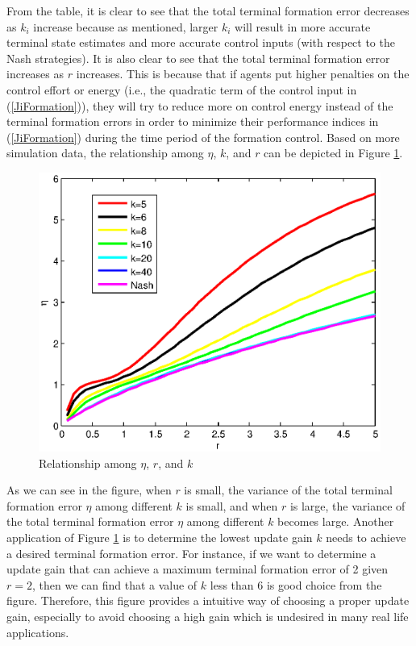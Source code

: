 \documentclass[12pt,draftcls,onecolumn]{IEEEtran}  %
\begin{document}
From the table, it is clear to see that the total terminal formation error decreases as $k_i$ increase because as mentioned, larger $k_i$ will result in more accurate terminal state estimates and more accurate control inputs (with respect to the Nash strategies). It is also clear to see that the total terminal formation error increases as $r$ increases. This is because that if agents put higher penalties on the control effort or energy (i.e., the quadratic term of the control input in (\ref{JiFormation})), they will try to reduce more on control energy instead of the terminal formation errors in order to minimize their performance indices in (\ref{JiFormation}) during the time period of the formation control. Based on more simulation data, the relationship among $\eta$, $k$, and $r$ can be depicted in Figure \ref{Relationship}.
\begin{figure}[h]
      \centering
      \includegraphics[scale=0.5]{PlotT.eps}
      \caption{Relationship among $\eta$, $r$, and $k$}\label{Relationship}
\end{figure}
As we can see in the figure, when $r$ is small, the variance of the total terminal formation error $\eta$ among different $k$ is small, and when $r$ is large, the variance of the total terminal formation error $\eta$ among different $k$ becomes large. Another application of Figure \ref{Relationship} is to determine the lowest update gain $k$ needs to achieve a desired terminal formation error. For instance, if we want to determine a update gain that can achieve a maximum terminal formation error of 2 given $r=2$, then we can find that a value of $k$ less than $6$ is good choice from the figure. Therefore, this figure provides a intuitive way of choosing a proper update gain, especially to avoid choosing a high gain which is undesired in many real life applications.
\end{document}
